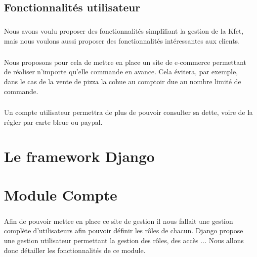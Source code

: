 \documentclass[twoside,UTF8]{EPURapport}
\begin{document}
    \section{Fonctionnalités utilisateur}

        \paragraph{}Nous avons voulu proposer des fonctionnalités simplifiant la gestion de la Kfet, mais nous voulons aussi proposer des fonctionnalités intéressantes aux clients.

        \paragraph{}Nous proposons pour cela de mettre en place un site de e-commerce permettant de réaliser n'importe qu'elle commande en avance. Cela évitera, par exemple, dans le cas de la vente de pizza la cohue au comptoir due au nombre limité de commande.

        \paragraph{}Un compte utilisateur permettra de plus de pouvoir consulter sa dette, voire de la régler par carte bleue ou paypal.

\chapter{Le framework Django}

\chapter{Module Compte}

    \paragraph{}Afin de pouvoir mettre en place ce site de gestion il nous fallait une gestion complète d'utilisateurs afin pouvoir définir les rôles de chacun. Django propose une gestion utilisateur permettant la gestion des rôles, des accès ... Nous allons donc détailler les fonctionnalités de ce module.
\end{document}

